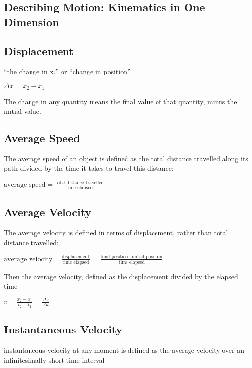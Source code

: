 \documentclass{extarticle}
\begin{document}
 
\begin{multicols}{4}




\setcounter{secnumdepth}{0}


\section{Describing Motion:
Kinematics in One Dimension}

\subsection{Displacement}
“the change in x,” or “change in position” 

$\Delta x = x_2 - x_1$

The change in any quantity means the final value of that quantity, minus the initial value.

\subsection{Average Speed}
The average speed of an object is defined as the total distance travelled along its path divided by the time it takes to travel this distance:

$\text{average speed} = \frac{\text{total distance travelled}}{\text{time elapsed}}$

\subsection{Average Velocity}
The average velocity is defined in terms of displacement, rather than total distance travelled:

$\text{average velocity} = \frac{ \text{displacement} }{ \text{time elapsed} } = \frac{ \text{final position} - \text{initial position} }{ \text{time elapsed} }$



Then the average velocity, defined as the displacement divided by the elapsed time

$\bar{v} = \frac{x_2 - x_1}{t_2 - t_1} = \frac{\Delta x}{\Delta t}$


\subsection{Instantaneous Velocity}
instantaneous velocity at any moment is defined as the average velocity over an infinitesimally short time interval


\end{multicols}
\end{document}
